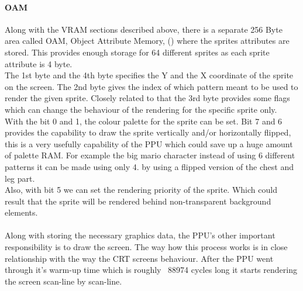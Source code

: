 \documentclass[]{report}
\begin{document}
\paragraph{OAM }
Along with the VRAM sections described above, there is a separate 256 Byte area called OAM, Object Attribute Memory, (\cite{OAMT}) where the sprites attributes are stored. This provides enough storage for 64 different sprites as each sprite attribute is 4 byte. 
\\
The 1st byte and the 4th byte specifies the Y and the X coordinate of the sprite on the screen. The 2nd byte gives the index of which pattern meant to be used to render the given sprite. Closely related to that the 3rd byte provides some flags which can change the behaviour of the rendering for the specific sprite only. 
\\
With the bit 0 and 1, the colour palette for the sprite can be set. Bit 7 and 6 provides the capability to draw the sprite vertically and/or horizontally flipped, this is a very usefully capability of the PPU which could save up a huge amount of palette RAM. For example the big mario character instead of using 6 different patterns it can be made using only 4. by using a flipped version of the chest and leg part.
\\
Also, with bit 5 we can set the rendering priority of the sprite. Which could result that the sprite will be rendered behind non-transparent background elements.

\paragraph{ }
Along with storing the necessary graphics data, the PPU's other important responsibility is to draw the screen. The way how this process works is in close relationship with the way the CRT screens behaviour.
After the PPU went through it's warm-up time which is roughly ~88974 cycles long it starts rendering the screen scan-line by scan-line.  
\end{document}
